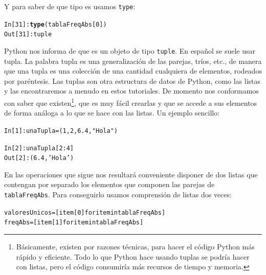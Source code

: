 \documentclass[10pt,a4paper]{article}\usepackage[]{graphicx}\usepackage[]{color}
\makeatletter
\newcommand{\hlnum}[1]{\textcolor[rgb]{0.686,0.059,0.569}{#1}}%
\newcommand{\hlstr}[1]{\textcolor[rgb]{0.192,0.494,0.8}{#1}}%
\newcommand{\hlopt}[1]{\textcolor[rgb]{0,0,0}{#1}}%
\newcommand{\hlstd}[1]{\textcolor[rgb]{0.345,0.345,0.345}{#1}}%
\newcommand{\hlkwd}[1]{\textcolor[rgb]{0.737,0.353,0.396}{\textbf{#1}}}%
\newenvironment{kframe}{%
 \def\at@end@of@kframe{}%
 \ifinner\ifhmode%
  \def\at@end@of@kframe{\end{minipage}}%
  \begin{minipage}{\columnwidth}%
 \fi\fi%
 \def\FrameCommand##1{\hskip\@totalleftmargin \hskip-\fboxsep
 \colorbox{shadecolor}{##1}\hskip-\fboxsep
     \hskip-\linewidth \hskip-\@totalleftmargin \hskip\columnwidth}%
 \MakeFramed {\advance\hsize-\width
   \@totalleftmargin\z@ \linewidth\hsize
   \@setminipage}}%
 {\par\unskip\endMakeFramed%
 \at@end@of@kframe}
\newenvironment{knitrout}{}{} %
\newcounter {cont01}
\makeatother
\begin{document}
Y para saber de que tipo es usamos {\tt type}:
\begin{knitrout}
\color{fgcolor}\begin{kframe}
\begin{alltt}
\hlstd{In [}\hlnum{31}\hlstd{]}\hlopt{:} \hlkwd{type}\hlstd{(tablaFreqAbs[}\hlnum{0}\hlstd{])}
\hlstd{Out[}\hlnum{31}\hlstd{]}\hlopt{:} \hlstd{tuple}
\end{alltt}
\end{kframe}
\end{knitrout}
Python nos informa de que es un objeto de tipo {\tt tuple}. En español se suele usar {\sf tupla}. La palabra tupla es una generalización de las parejas, tríos, etc., de manera que una tupla es una colección de una cantidad cualquiera de elementos, rodeados por paréntesis. Las tuplas son otra estructura de datos de Python, como las listas y las encontraremos a menudo en estos tutoriales. De momento nos conformamos con saber que existen\footnote{Básicamente, existen por razones técnicas, para hacer el código Python más rápido y eficiente. Todo lo que Python hace usando tuplas se podría hacer con listas, pero el código consumiría más recursos de tiempo y memoria.}, que es muy fácil crearlas y que se accede a sus elementos de forma análoga a lo que se hace con las listas. Un ejemplo sencillo:
\begin{knitrout}
\color{fgcolor}\begin{kframe}
\begin{alltt}
In [1]: unaTupla = (1, 2, 6.4, \hlstr{"Hola"})

In [2]: unaTupla[2:4]
Out[2]: (6.4, \hlstr{'Hola'})
\end{alltt}
\end{kframe}
\end{knitrout}
En las operaciones que sigue nos resultará conveniente disponer de dos listas que contengan por separado los elementos que componen las parejas de {\tt tablaFreqAbs}. Para conseguirlo usamos comprensión de listas dos veces:
\begin{knitrout}
\color{fgcolor}\begin{kframe}
\begin{alltt}
valoresUnicos = [ item[0] for item in tablaFreqAbs]
freqAbs = [ item[1] for item in tablaFreqAbs]
\end{alltt}
\end{kframe}
\end{knitrout}
\end{document}
